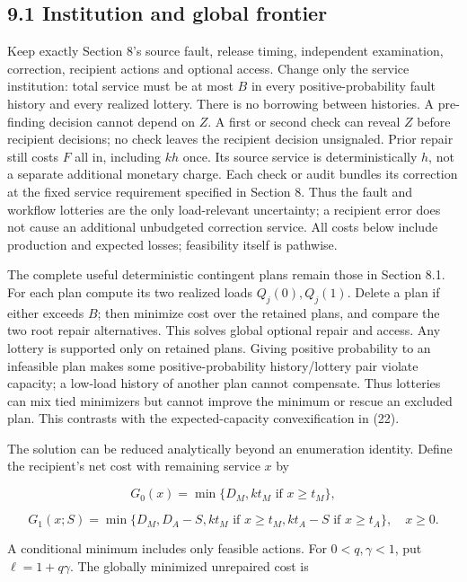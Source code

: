 \documentclass[
  11pt,
  a4paper,
]{article}
\begin{document}
\hypertarget{institution-and-global-frontier}{%
\subsection{9.1 Institution and global
frontier}\label{institution-and-global-frontier}}

Keep exactly Section 8's source fault, release timing, independent
examination, correction, recipient actions and optional access. Change
only the service institution: total service must be at most \(B\) in
every positive-probability fault history and every realized lottery.
There is no borrowing between histories. A pre-finding decision cannot
depend on \(Z\). A first or second check can reveal \(Z\) before
recipient decisions; no check leaves the recipient decision unsignaled.
Prior repair still costs \(F\) all in, including \(kh\) once. Its source
service is deterministically \(h\), not a separate additional monetary
charge. Each check or audit bundles its correction at the fixed service
requirement specified in Section 8. Thus the fault and workflow
lotteries are the only load-relevant uncertainty; a recipient error does
not cause an additional unbudgeted correction service. All costs below
include production and expected losses; feasibility itself is pathwise.

The complete useful deterministic contingent plans remain those in
Section 8.1. For each plan compute its two realized loads
\(Q_j(0),Q_j(1)\). Delete a plan if either exceeds \(B\); then minimize
cost over the retained plans, and compare the two root repair
alternatives. This solves global optional repair and access. Any lottery
is supported only on retained plans. Giving positive probability to an
infeasible plan makes some positive-probability history/lottery pair
violate capacity; a low-load history of another plan cannot compensate.
Thus lotteries can mix tied minimizers but cannot improve the minimum or
rescue an excluded plan. This contrasts with the expected-capacity
convexification in (22).

The solution can be reduced analytically beyond an enumeration identity.
Define the recipient's net cost with remaining service \(x\) by

\[G_0(x)=\min\{D_M,kt_M\text{ if }x\geq t_M\},\]

\[G_1(x;S)=\min\{D_M,D_A-S,kt_M\text{ if }x\geq t_M,
kt_A-S\text{ if }x\geq t_A\},\quad x\geq0. \tag{30}\]

A conditional minimum includes only feasible actions. For
\(0<q,\gamma<1\), put \(\ell=1+q\gamma\). The globally minimized
unrepaired cost is
\end{document}
